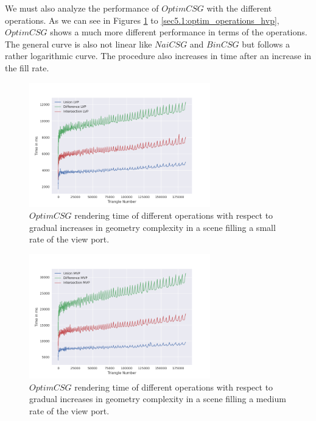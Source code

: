 \documentclass[a4paper,11pt,oneside]{article}
\begin{document}
We must also analyze the performance of $OptimCSG$ with the different operations. As we can see in Figures \ref{sec5.1:optim_operations_lvp} to \ref{sec5.1:optim_operations_hvp}, $OptimCSG$ shows a much more different performance in terms of the operations. The general curve is also not linear like $NaiCSG$ and $BinCSG$ but follows a rather logarithmic curve. The procedure also increases in time after an increase in the fill rate.

\begin{figure}[H]
	\centering
	\includegraphics[width=0.7\textwidth]{section5/plots/optim_csg_lvp.png}
	\caption{$OptimCSG$ rendering time of different operations with respect to gradual increases in geometry complexity in a scene filling a small rate of the view port.}
	\label{sec5.1:optim_operations_lvp}
\end{figure}

\begin{figure}[H]
	\centering
	\includegraphics[width=0.7\textwidth]{section5/plots/optim_csg_mvp.png}
	\caption{$OptimCSG$ rendering time of different operations with respect to gradual increases in geometry complexity in a scene filling a medium rate of the view port.}
	\label{sec5.1:optim_operations_mvp}
\end{figure}
\end{document}
